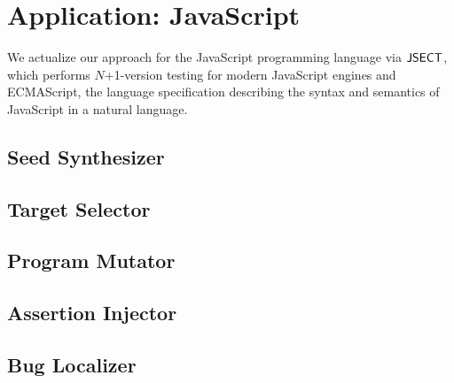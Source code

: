 \section{Application: JavaScript}\label{sec:application}

We actualize our approach for the JavaScript programming language via $\text{\sf JSECT}$,
which performs $N$+1-version testing for modern JavaScript engines and
ECMAScript, the language specification describing the syntax and semantics of
JavaScript in a natural language.


\subsection{Seed Synthesizer}


\subsection{Target Selector}


\subsection{Program Mutator}


\subsection{Assertion Injector}


\subsection{Bug Localizer}

